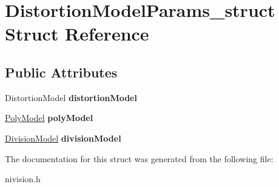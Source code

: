 \hypertarget{structDistortionModelParams__struct}{
\section{DistortionModelParams\_\-struct Struct Reference}
\label{structDistortionModelParams__struct}
}
\subsection*{Public Attributes}
\begin{DoxyCompactItemize}
\item 
\hypertarget{structDistortionModelParams__struct_a639d8fd5803dde63e88c7e845b17f96a}{
DistortionModel {\bfseries distortionModel}}
\label{structDistortionModelParams__struct_a639d8fd5803dde63e88c7e845b17f96a}

\item 
\hypertarget{structDistortionModelParams__struct_aaf51625e4c21ca8f6520bbbb4f139f45}{
\hyperlink{structPolyModel__struct}{PolyModel} {\bfseries polyModel}}
\label{structDistortionModelParams__struct_aaf51625e4c21ca8f6520bbbb4f139f45}

\item 
\hypertarget{structDistortionModelParams__struct_a1db4845372713e948ae12ec25321e423}{
\hyperlink{structDivisionModel__struct}{DivisionModel} {\bfseries divisionModel}}
\label{structDistortionModelParams__struct_a1db4845372713e948ae12ec25321e423}

\end{DoxyCompactItemize}


The documentation for this struct was generated from the following file:\begin{DoxyCompactItemize}
\item 
nivision.h\end{DoxyCompactItemize}
